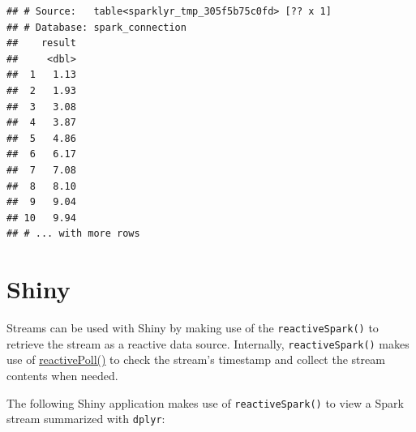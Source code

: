 \documentclass[]{book}
\newenvironment{Shaded}{\begin{snugshade}}{\end{snugshade}}
\newcommand{\KeywordTok}[1]{\textcolor[rgb]{0.13,0.29,0.53}{\textbf{#1}}}
\newcommand{\NormalTok}[1]{#1}
\newcommand{\OperatorTok}[1]{\textcolor[rgb]{0.81,0.36,0.00}{\textbf{#1}}}
\newcommand{\StringTok}[1]{\textcolor[rgb]{0.31,0.60,0.02}{#1}}
\theoremstyle{definition}
\theoremstyle{definition}
\theoremstyle{definition}
\theoremstyle{remark}
\begin{document}
\begin{Shaded}
\end{Shaded}

\begin{verbatim}
## # Source:   table<sparklyr_tmp_305f5b75c0fd> [?? x 1]
## # Database: spark_connection
##    result
##     <dbl>
##  1   1.13
##  2   1.93
##  3   3.08
##  4   3.87
##  5   4.86
##  6   6.17
##  7   7.08
##  8   8.10
##  9   9.04
## 10   9.94
## # ... with more rows
\end{verbatim}

\hypertarget{shiny}{%
\section{Shiny}\label{shiny}}

Streams can be used with Shiny by making use of the
\texttt{reactiveSpark()} to retrieve the stream as a reactive data
source. Internally, \texttt{reactiveSpark()} makes use of
\href{https://shiny.rstudio.com/reference/shiny/latest/reactivePoll.html}{reactivePoll()}
to check the stream's timestamp and collect the stream contents when
needed.

The following Shiny application makes use of \texttt{reactiveSpark()} to
view a Spark stream summarized with \texttt{dplyr}:
\end{document}
